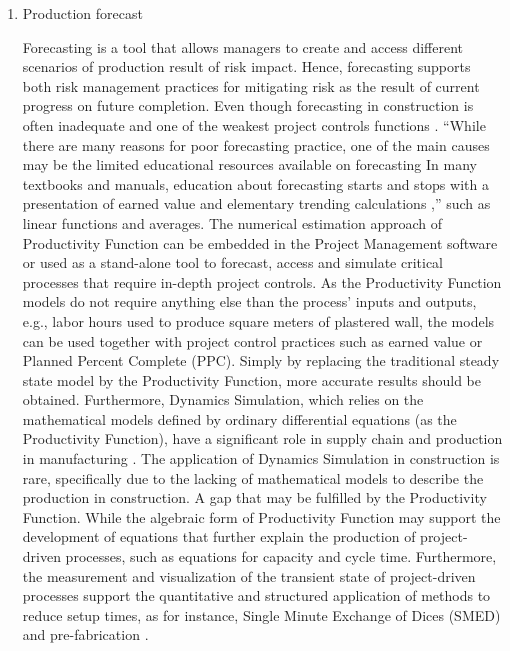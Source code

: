 \documentclass{article}
\begin{document}
\begin{enumerate}
\item Production forecast
\label{sec:org9f285f7}

Forecasting is a tool that allows managers to create and access different scenarios of production result of risk impact.
Hence, forecasting supports both risk management practices for mitigating risk as the result of current progress on future completion.
Even though forecasting in construction is often inadequate and one of the weakest project controls functions \citep{ConstructionIndustryInstitute2012}.
``While there are many reasons for poor forecasting practice, one of the main causes may be the limited educational resources available on forecasting
In many textbooks and manuals, education about forecasting starts and stops with a presentation of earned value and elementary trending calculations \citep{ConstructionIndustryInstitute2012a},'' such as linear functions and averages.
The numerical estimation approach of Productivity Function can be embedded in the Project Management software or used as a stand-alone tool to forecast, access and simulate critical processes that require in-depth project controls.
As the Productivity Function models do not require anything else than the process' inputs and outputs, e.g., labor hours used to produce square meters of plastered wall, the models can be used together with project control practices such as earned value or Planned Percent Complete (PPC).
Simply by replacing the traditional steady state model by the Productivity Function, more accurate results should be obtained.
Furthermore, Dynamics Simulation, which relies on the mathematical models defined by ordinary differential equations (as the Productivity Function), have a significant role in supply chain \citep{Higuchi2004} and production in manufacturing \citep{Forrester1997}.
The application of Dynamics Simulation in construction is rare, specifically due to the lacking of mathematical models to describe the production in construction.
A gap that may be fulfilled by the Productivity Function.
While the algebraic form of Productivity Function may support the development of equations that further explain the production of project-driven processes, such as equations for capacity and cycle time.
Furthermore, the measurement and visualization of the transient state of project-driven processes support the quantitative and structured application of methods to reduce setup times, as for instance, Single Minute Exchange of Dices (SMED) and pre-fabrication \citep{Antunes2016}.


\end{enumerate}
\end{document}
